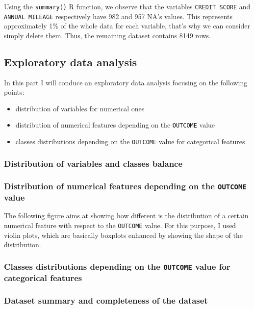 \documentclass[a4paper,11pt, titlepage]{article}
\begin{document}
Using the {\tt summary()} R function, we observe that the variables {\tt CREDIT SCORE} and {\tt ANNUAL MILEAGE} respectively have 982 and 957 NA's values. This represents approximately 1\% of the whole data for each variable, that's why we can consider simply delete them. Thus, the remaining dataset contains 8149 rows. 

\subsection{Exploratory data analysis}

In this part I will conduce an exploratory data analysis focusing on the following points:
\begin{itemize}
    \item distribution of variables for numerical ones
    \item distribution of numerical features depending on the {\tt OUTCOME} value
    \item classes distributions depending on the {\tt OUTCOME} value for categorical features
\end{itemize}

\subsubsection{Distribution of variables and classes balance}

\subsubsection{Distribution of numerical features depending on the {\tt OUTCOME} value}

The following figure aims at showing how different is the distribution of a certain numerical feature with respect to the {\tt OUTCOME} value. For this purpose, I used violin plots, which are basically boxplots enhanced by showing the shape of the distribution.

\subsubsection{Classes distributions depending on the {\tt OUTCOME} value for categorical features}

\subsubsection{Dataset summary and completeness of the dataset}
\end{document}
